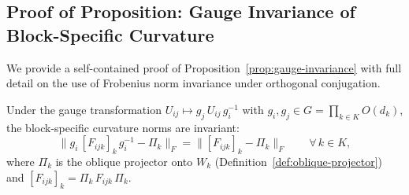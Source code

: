\subsection{Proof of Proposition: Gauge Invariance of Block-Specific Curvature}
\label{app:proof-gauge-invariance}

We provide a self-contained proof of Proposition~\ref{prop:gauge-invariance} with full
detail on the use of Frobenius norm invariance under orthogonal conjugation.

\begin{proposition}
\label{prop:gauge-invariance-app}
Under the gauge transformation $U_{ij} \mapsto g_j\, U_{ij}\, g_i^{-1}$ with $g_i, g_j
\in G = \prod_{k \in K} O(d_k)$, the block-specific curvature norms are invariant:
\[
    \big\|g_i\, [F_{ijk}]_k\, g_i^{-1} - \Pi_k\big\|_F
    = \big\|[F_{ijk}]_k - \Pi_k\big\|_F
    \qquad \forall\, k \in K,
\]
where $\Pi_k$ is the oblique projector onto $W_k$ (Definition~\ref{def:oblique-projector})
and $[F_{ijk}]_k = \Pi_k\, F_{ijk}\, \Pi_k$.
\end{proposition}

